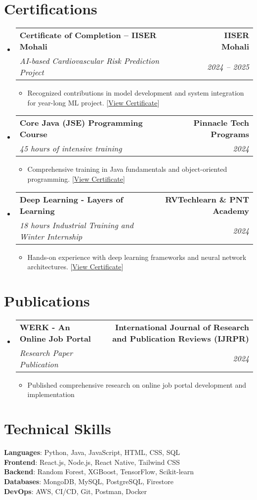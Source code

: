 \documentclass[letterpaper,10pt]{article}
\makeatletter
\newcommand{\resumeItem}[1]{
  \item\small{
    {#1 \vspace{-1pt}}
  }
}
\newcommand{\resumeSubheading}[4]{
  \vspace{-3pt}\item
    \begin{tabular*}{1.0\textwidth}[t]{l@{\extracolsep{\fill}}r}
      \textbf{#1} & \textbf{\small #2} \\
      \textit{\small#3} & \textit{\small #4} \\
    \end{tabular*}\vspace{-8pt}
}
\newcommand{\resumeSubHeadingListStart}{\begin{itemize}[leftmargin=0.0in, label={}]}
\newcommand{\resumeSubHeadingListEnd}{\end{itemize}}
\newcommand{\resumeItemListStart}{\begin{itemize}[itemsep=-2pt, parsep=0pt]}
\newcommand{\resumeItemListEnd}{\end{itemize}\vspace{-6pt}}
\makeatother
\begin{document}
\section{Certifications}
    \resumeSubHeadingListStart
      \resumeSubheading
        {Certificate of Completion -- IISER Mohali}{IISER Mohali}
        {AI-based Cardiovascular Risk Prediction Project}{2024 -- 2025}
        \resumeItemListStart
          \resumeItem{Recognized contributions in model development and system integration for year-long ML project. [\href{https://drive.google.com/file/d/1tXeZ835o0nwGwzxtc9oHEuiaVe_46iDa/view?usp=sharing}{\color{blue}View Certificate}]}
        \resumeItemListEnd

      \resumeSubheading
        {Core Java (JSE) Programming Course}{Pinnacle Tech Programs}
        {45 hours of intensive training}{2024}
        \resumeItemListStart
          \resumeItem{Comprehensive training in Java fundamentals and object-oriented programming. [\href{https://drive.google.com/file/d/1Lf2cOTG3Nwv9vOYOVXjcn3a3jWpDPUBj/view?usp=sharing}{\color{blue}View Certificate}]}
        \resumeItemListEnd

      \resumeSubheading
        {Deep Learning - Layers of Learning}{RVTechlearn \& PNT Academy}
        {18 hours Industrial Training and Winter Internship}{2024}
        \resumeItemListStart
          \resumeItem{Hands-on experience with deep learning frameworks and neural network architectures. [\href{https://drive.google.com/file/d/1LZmzLzCd4g8qe_HMNEf_ERyJBaHTfGbe/view?usp=sharing}{\color{blue}View Certificate}]}
        \resumeItemListEnd
    \resumeSubHeadingListEnd

\section{Publications}
    \resumeSubHeadingListStart
      \resumeSubheading
        {WERK - An Online Job Portal}{International Journal of Research and Publication Reviews (IJRPR)}
        {Research Paper Publication}{2024}
        \resumeItemListStart
          \resumeItem{Published comprehensive research on online job portal development and implementation}
        \resumeItemListEnd
    \resumeSubHeadingListEnd

\section{Technical Skills}
 \begin{itemize}[leftmargin=0.15in, label={}]
    \small{\item{
     \textbf{Languages}{: Python, Java, JavaScript, HTML, CSS, SQL} \\
     \textbf{Frontend}{: React.js, Node.js, React Native, Tailwind CSS} \\
     \textbf{Backend}{: Random Forest, XGBoost, TensorFlow, Scikit-learn} \\
     \textbf{Databases}{: MongoDB, MySQL, PostgreSQL, Firestore} \\
     \textbf{DevOps}{: AWS, CI/CD, Git, Postman, Docker}
    }}
 \end{itemize}
\end{document}
